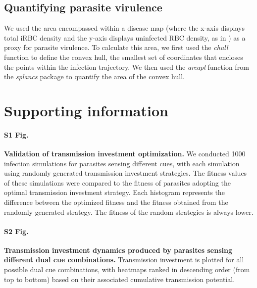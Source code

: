 \documentclass[10pt,letterpaper]{article}
\begin{document}
\subsection*{Quantifying parasite virulence}
We used the area encompassed within a disease map (where the x-axis displays total iRBC density and the y-axis displays uninfected RBC density, as in \cite{torres_tracking_2016}) as a proxy for parasite virulence. To calculate this area, we first used the \emph{chull} function \cite{r_core_team_r_2021} to define the convex hull, the smallest set of coordinates that encloses the points within the infection trajectory. We then used the \emph{areapl} function from the \emph{splancs} package \cite{bivand_splancs_2024} to quantify the area of the convex hull.

\section*{Supporting information}
\paragraph*{S1 Fig.}
\label{S1_Fig}
{\bf Validation of transmission investment optimization.} We conducted 1000 infection simulations for parasites sensing different cues, with each simulation using randomly generated transmission investment strategies. The fitness values of these simulations were compared to the fitness of parasites adopting the optimal transmission investment strategy. Each histogram represents the difference between the optimized fitness and the fitness obtained from the randomly generated strategy. The fitness of the random strategies is always lower.\newline 

\paragraph*{S2 Fig.}
\label{S2_Fig}
{\bf Transmission investment dynamics produced by parasites sensing different dual cue combinations.} Transmission investment is plotted for all possible dual cue combinations, with heatmaps ranked in descending order (from top to bottom) based on their associated cumulative transmission potential.\newline 
\end{document}
